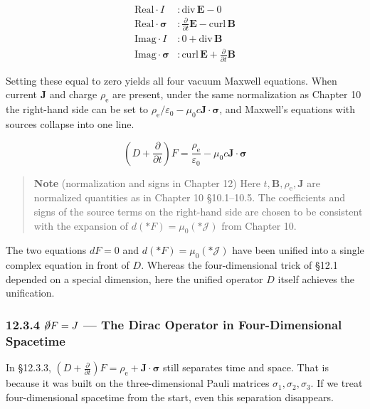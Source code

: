 \documentclass[a4paper,12pt,openany]{book}
\begin{document}
\[
\begin{aligned}
\text{Real}\cdot I &: \mathrm{div}\,\mathbf{E} - 0 \\
\text{Real}\cdot\bm{\sigma} &: \frac{\partial}{\partial t}\mathbf{E} - \mathrm{curl}\,\mathbf{B} \\
\text{Imag}\cdot I &: 0 + \mathrm{div}\,\mathbf{B} \\
\text{Imag}\cdot\bm{\sigma} &: \mathrm{curl}\,\mathbf{E} + \frac{\partial}{\partial t}\mathbf{B}
\end{aligned}
\]

Setting these equal to zero yields all four vacuum Maxwell equations.
When current \(\mathbf{J}\) and charge \(\rho_{\mathrm e}\) are present,
under the same normalization as Chapter 10 the right-hand side can be
set to
\(\rho_{\mathrm e}/\varepsilon_0 - \mu_0 c \mathbf{J}\!\cdot\!\bm{\sigma}\),
and Maxwell's equations with sources collapse into one line.

\[(D + \frac{\partial}{\partial t})F = \frac{\rho_{\mathrm e}}{\varepsilon_0} - \mu_0 c \mathbf{J}\!\cdot\!\bm{\sigma}\]

\begin{quote}
\textbf{Note} (normalization and signs in Chapter 12) Here
\(t, \mathbf{B}, \rho_{\mathrm e}, \mathbf{J}\) are normalized
quantities as in Chapter 10 §10.1–10.5. The coefficients and signs of
the source terms on the right-hand side are chosen to be consistent with
the expansion of \(d(\ast F) = \mu_0(\ast\mathcal{J})\) from Chapter 10.
\end{quote}

The two equations \(dF=0\) and \(d(\ast F)=\mu_0(\ast\mathcal{J})\) have
been unified into a single complex equation in front of \(D\). Whereas
the four-dimensional trick of §12.1 depended on a special dimension,
here the unified operator \(D\) itself achieves the unification.

\hypertarget{cancelpartial-f-j-the-dirac-operator-in-four-dimensional-spacetime}{%
\subsubsection{\texorpdfstring{12.3.4 \(\cancel{\partial} F = J\) —
The Dirac Operator in Four-Dimensional
Spacetime}{12.3.4 \textbackslash cancel\{\textbackslash partial\} F = J — The Dirac Operator in Four-Dimensional Spacetime}}\label{cancelpartial-f-j-the-dirac-operator-in-four-dimensional-spacetime}}

In §12.3.3,
\((D + \frac{\partial}{\partial t})F = \rho_{\mathrm e} + \mathbf{J}\!\cdot\!\bm{\sigma}\)
still separates time and space. That is because it was built on the
three-dimensional Pauli matrices \(\sigma_1,\sigma_2,\sigma_3\). If we
treat four-dimensional spacetime from the start, even this separation
disappears.
\end{document}
